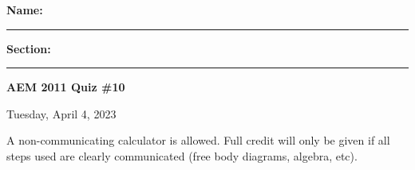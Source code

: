 \documentclass{article}
\begin{document}

\vspace{.5cm}
\noindent
\textbf{Name: }\rule{5cm}{0.4pt}\hspace{.5cm}
\textbf{Section: }\rule{1cm}{0.4pt}
\hfill\textbf{AEM 2011 Quiz \#10}

\noindent
\hfill Tuesday, April 4, 2023
\vspace{1cm}
\noindent

\vspace{.3cm}

\noindent A non-communicating calculator is allowed.  Full credit will only be given if all steps used are clearly communicated (free body diagrams, algebra, etc).

\vspace{0.5cm}










\end{document}

